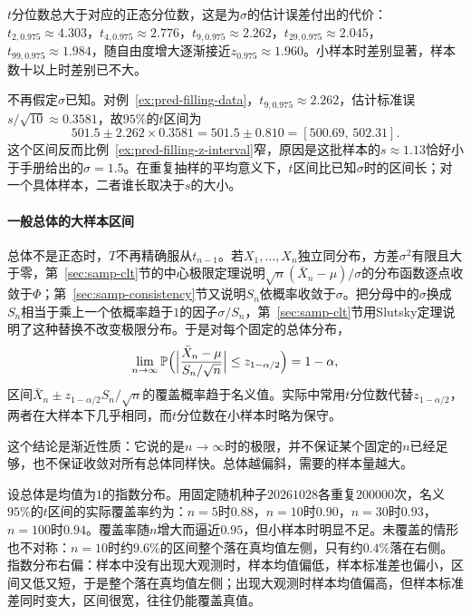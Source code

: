 $t$分位数总大于对应的正态分位数，这是为$\sigma$的估计误差付出的代价：$t_{2,0.975}\approx4.303$，$t_{4,0.975}\approx2.776$，$t_{9,0.975}\approx2.262$，$t_{29,0.975}\approx2.045$，$t_{99,0.975}\approx1.984$，随自由度增大逐渐接近$z_{0.975}\approx1.960$。小样本时差别显著，样本数十以上时差别已不大。

\begin{example}[方差未知时的灌装量区间]
\label{ex:pred-filling-t-interval}
不再假定$\sigma$已知。对例~\ref{ex:pred-filling-data}，$t_{9,0.975}\approx2.262$，估计标准误$s/\sqrt{10}\approx0.3581$，故$95\%$的$t$区间为
\[
 501.5\pm2.262\times0.3581=501.5\pm0.810=[500.69,\,502.31].
\]
这个区间反而比例~\ref{ex:pred-filling-z-interval}窄，原因是这批样本的$s\approx1.13$恰好小于手册给出的$\sigma=1.5$。在重复抽样的平均意义下，$t$区间比已知$\sigma$时的区间长；对一个具体样本，二者谁长取决于$s$的大小。
\end{example}

\paragraph{一般总体的大样本区间}

总体不是正态时，$T$不再精确服从$t_{n-1}$。若$X_1,\dots,X_n$独立同分布，方差$\sigma^2$有限且大于零，第~\ref{sec:samp-clt}节的中心极限定理说明$\sqrt n(\bar X_n-\mu)/\sigma$的分布函数逐点收敛于$\Phi$；第~\ref{sec:samp-consistency}节又说明$S_n$依概率收敛于$\sigma$。把分母中的$\sigma$换成$S_n$相当于乘上一个依概率趋于$1$的因子$\sigma/S_n$，第~\ref{sec:samp-clt}节用Slutsky定理说明了这种替换不改变极限分布。于是对每个固定的总体分布，
\[
 \lim_{n\to\infty}\mathbb P\Bigl(\Bigl|\frac{\bar X_n-\mu}{S_n/\sqrt n}\Bigr|\leq z_{1-\alpha/2}\Bigr)=1-\alpha,
\]
区间$\bar X_n\pm z_{1-\alpha/2}S_n/\sqrt n$的覆盖概率趋于名义值。实际中常用$t$分位数代替$z_{1-\alpha/2}$，两者在大样本下几乎相同，而$t$分位数在小样本时略为保守。

这个结论是渐近性质：它说的是$n\to\infty$时的极限，并不保证某个固定的$n$已经足够，也不保证收敛对所有总体同样快。总体越偏斜，需要的样本量越大。

\begin{example}[偏斜总体下的$t$区间]
\label{ex:pred-exponential-coverage}
设总体是均值为$1$的指数分布。用固定随机种子$20261028$各重复$200000$次，名义$95\%$的$t$区间的实际覆盖率约为：$n=5$时$0.88$，$n=10$时$0.90$，$n=30$时$0.93$，$n=100$时$0.94$。覆盖率随$n$增大而逼近$0.95$，但小样本时明显不足。未覆盖的情形也不对称：$n=10$时约$9.6\%$的区间整个落在真均值左侧，只有约$0.4\%$落在右侧。指数分布右偏：样本中没有出现大观测时，样本均值偏低，样本标准差也偏小，区间又低又短，于是整个落在真均值左侧；出现大观测时样本均值偏高，但样本标准差同时变大，区间很宽，往往仍能覆盖真值。
\end{example}

